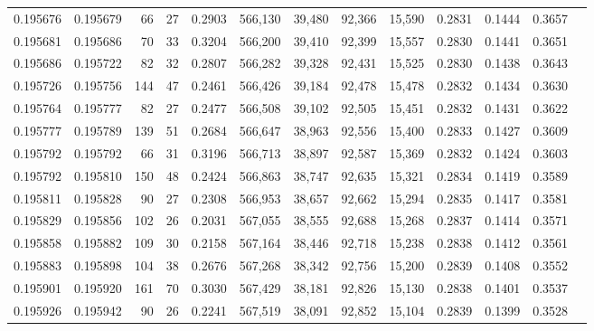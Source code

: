 \begin{tabular}{rrrrrrrrrrrrr}
0.195676 & 0.195679 &    66 &  27 &                                     0.2903 & 566,130 &  39,480 &  92,366 &  15,590 & 0.2831 & 0.1444 & 0.3657 \\
0.195681 & 0.195686 &    70 &  33 &                                     0.3204 & 566,200 &  39,410 &  92,399 &  15,557 & 0.2830 & 0.1441 & 0.3651 \\
0.195686 & 0.195722 &    82 &  32 &                                     0.2807 & 566,282 &  39,328 &  92,431 &  15,525 & 0.2830 & 0.1438 & 0.3643 \\
0.195726 & 0.195756 &   144 &  47 &                                     0.2461 & 566,426 &  39,184 &  92,478 &  15,478 & 0.2832 & 0.1434 & 0.3630 \\
0.195764 & 0.195777 &    82 &  27 &                                     0.2477 & 566,508 &  39,102 &  92,505 &  15,451 & 0.2832 & 0.1431 & 0.3622 \\
0.195777 & 0.195789 &   139 &  51 &                                     0.2684 & 566,647 &  38,963 &  92,556 &  15,400 & 0.2833 & 0.1427 & 0.3609 \\
0.195792 & 0.195792 &    66 &  31 &                                     0.3196 & 566,713 &  38,897 &  92,587 &  15,369 & 0.2832 & 0.1424 & 0.3603 \\
0.195792 & 0.195810 &   150 &  48 &                                     0.2424 & 566,863 &  38,747 &  92,635 &  15,321 & 0.2834 & 0.1419 & 0.3589 \\
0.195811 & 0.195828 &    90 &  27 &                                     0.2308 & 566,953 &  38,657 &  92,662 &  15,294 & 0.2835 & 0.1417 & 0.3581 \\
0.195829 & 0.195856 &   102 &  26 &                                     0.2031 & 567,055 &  38,555 &  92,688 &  15,268 & 0.2837 & 0.1414 & 0.3571 \\
0.195858 & 0.195882 &   109 &  30 &                                     0.2158 & 567,164 &  38,446 &  92,718 &  15,238 & 0.2838 & 0.1412 & 0.3561 \\
0.195883 & 0.195898 &   104 &  38 &                                     0.2676 & 567,268 &  38,342 &  92,756 &  15,200 & 0.2839 & 0.1408 & 0.3552 \\
0.195901 & 0.195920 &   161 &  70 &                                     0.3030 & 567,429 &  38,181 &  92,826 &  15,130 & 0.2838 & 0.1401 & 0.3537 \\
0.195926 & 0.195942 &    90 &  26 &                                     0.2241 & 567,519 &  38,091 &  92,852 &  15,104 & 0.2839 & 0.1399 & 0.3528 \\

\end{tabular}
